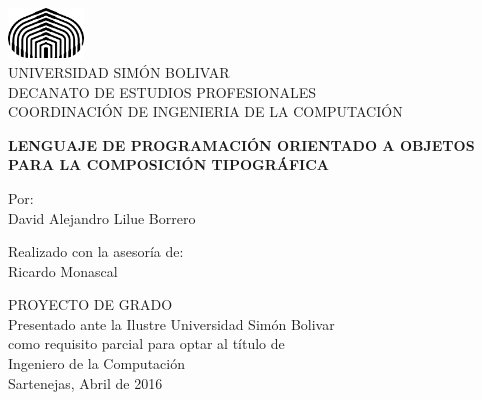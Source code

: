 \documentclass[12pt,letterpaper,titlepage,oneside,openright]{book}
\begin{document}
\begin{titlepage}
    \begin{center}
        \includegraphics[width=0.15\textwidth]{logo}\\
        {\large UNIVERSIDAD SIMÓN BOLIVAR}\\
        DECANATO DE ESTUDIOS PROFESIONALES\\
        COORDINACIÓN DE INGENIERIA DE LA COMPUTACIÓN
        
        \vspace{4em}

        \textbf{LENGUAJE DE PROGRAMACIÓN ORIENTADO A OBJETOS PARA LA COMPOSICIÓN TIPOGRÁFICA}
        
        \vspace{4em}
        Por:\\
        David Alejandro Lilue Borrero\\
        
        \vspace{4em}

        Realizado con la asesoría de:\\
        Ricardo Monascal\\

        \vspace{4em}

        PROYECTO DE GRADO\\
        Presentado ante la Ilustre Universidad Simón Bolivar\\
        como requisito parcial para optar al título de\\
        Ingeniero de la Computación\\
        
        \vfill
        Sartenejas, Abril de 2016
    \end{center}
\end{titlepage}



\setcounter{page}{4}

\newpage
\end{document}
